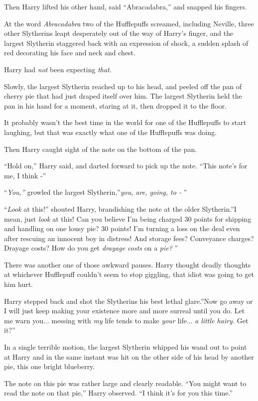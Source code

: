 Then Harry lifted his other hand, said ``Abracadabra,'' and snapped his
fingers.

At the word \emph{Abracadabra} two of the Hufflepuffs screamed,
including Neville, three other Slytherins leapt desperately out of the
way of Harry's finger, and the largest Slytherin staggered back with an
expression of shock, a sudden splash of red decorating his face and neck
and chest.

Harry had \emph{not} been expecting \emph{that}.

Slowly, the largest Slytherin reached up to his head, and peeled off the
pan of cherry pie that had just draped itself over him. The largest
Slytherin held the pan in his hand for a moment, staring at it, then
dropped it to the floor.

It probably wasn't the best time in the world for one of the Hufflepuffs
to start laughing, but that was exactly what one of the Hufflepuffs was
doing.

Then Harry caught sight of the note on the bottom of the pan.

``Hold on,'' Harry said, and darted forward to pick up the note. ``This
note's for me, I think -''

``\emph{You,''} growled the largest Slytherin,''\emph{you, are, going, to
-} ''

``\emph{Look} at this!'' shouted Harry, brandishing the note at the older
Slytherin.''I mean, just \emph{look} at this! Can you believe I'm being
charged 30 points for shipping and handling on one lousy pie? 30 points!
I'm turning a loss on the deal even after rescuing an innocent boy in
distress! And storage fees? Conveyance charges? Drayage costs? How do
you get \emph{drayage costs} on a \emph{pie?} ''

There was another one of those awkward pauses. Harry thought deadly
thoughts at whichever Hufflepuff couldn't seem to stop giggling, that
idiot was going to get him hurt.

Harry stepped back and shot the Slytherins his best lethal glare.''Now
go away or I will just keep making your existence more and more surreal
until you do. Let me warn you... messing with \emph{my} life tends
to make \emph{your} life... \emph{a little hairy.} Get it?''

In a single terrible motion, the largest Slytherin whipped his wand out
to point at Harry and in the same instant was hit on the other side of
his head by another pie, this one bright blueberry.

The note on this pie was rather large and clearly readable. ``You might
want to read the note on that pie,'' Harry observed. ``I think it's for
you this time.''

